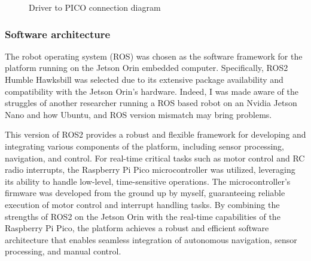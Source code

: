 \documentclass[11pt]{article}
\begin{document}
            
            
            \begin{figure}[h]
                \centering
                \color{red}
                Driver to PICO connection diagram
                \label{fig:driver_to_pico}
            \end{figure}

        
        
        \subsubsection{Software architecture}


        The robot operating system (ROS) was chosen as the software framework for the platform running on the Jetson Orin embedded computer. Specifically, ROS2 Humble Hawksbill was selected due to its extensive package availability and compatibility with the Jetson Orin's hardware. Indeed, I was made aware of the struggles of another researcher running a ROS based robot on an Nvidia Jetson Nano and how Ubuntu, and ROS version mismatch may bring problems. 
        
        This version of ROS2 provides a robust and flexible framework for developing and integrating various components of the platform, including sensor processing, navigation, and control. For real-time critical tasks such as motor control and RC radio interrupts, the Raspberry Pi Pico microcontroller was utilized, leveraging its ability to handle low-level, time-sensitive operations. The microcontroller's firmware was developed from the ground up by myself, guaranteeing reliable execution of motor control and interrupt handling tasks. By combining the strengths of ROS2 on the Jetson Orin with the real-time capabilities of the Raspberry Pi Pico, the platform achieves a robust and efficient software architecture that enables seamless integration of autonomous navigation, sensor processing, and manual control.
\end{document}
